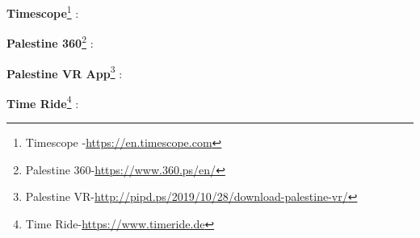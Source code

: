 \textbf{Timescope}\footnote{Timescope -\url{https://en.timescope.com}} : 

\textbf{Palestine 360}\footnote{Palestine 360-\url{https://www.360.ps/en/}} : 


\textbf{Palestine VR App}\footnote{Palestine VR-\url{http://pipd.ps/2019/10/28/download-palestine-vr/}} :


\textbf{Time Ride}\footnote{Time Ride-\url{https://www.timeride.de}} : 
